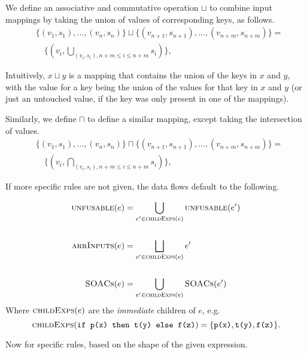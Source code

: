 \begin{description}
  We define an associative and commutative operation $\sqcup$ to
  combine input mappings by taking the union of values of
  corresponding keys, as follows.
  \begin{align*}
  &\{(v_{1},s_{1}),\ldots,(v_{n},s_{n})\} \sqcup \{(v_{n+1},s_{n+1}),\ldots,(v_{n+m},s_{n+m})\} =\\
  &\quad \{(v_{i}, \bigcup_{(v_{i},s_{i}),n+m \leq i \leq n+m} s_{i})\},
  \end{align*}

  Intuitively, $x \sqcup y$ is a mapping that contains the union of
  the keys in $x$ and $y$, with the value for a key being the union of
  the values for that key in $x$ and $y$ (or just an untouched value,
  if the key was only present in one of the mappings).

  Similarly, we define $\sqcap$ to define a similar mapping, except
  taking the intersection of values.
\begin{align*}
  &\{(v_{1},s_{1}),\ldots,(v_{n},s_{n})\} \sqcap \{(v_{n+1},s_{n+1}),\ldots,(v_{n+m},s_{n+m})\} =\\
  &\quad \{(v_{i}, \bigcap_{(v_{i},s_{i}),n+m \leq i \leq n+m} s_{i})\},
  \end{align*}
\end{description}

If more specific rules are not given, the data flows default to the
following.

\begin{align*}
  \textsc{unfusable}(e) &= \bigcup_{e'\in\textsc{childExps}(e)} \textsc{unfusable}(e') \\
  \\
  \textsc{arrInputs}(e) &= \bigsqcup_{e'\in\textsc{childExps}(e)} e'\\
  \\
  \textsc{SOACs}(e) &= \bigcup_{e'\in\textsc{childExps}(e)} \textsc{SOACs}(e')
\end{align*}
Where $\textsc{childExps}(e)$ are the \textit{immediate} children of $e$, e.g.
\[
\textsc{childExps}(\texttt{if p(x) then t(y) else f(z)}) = \{\texttt{p(x)}, \texttt{t(y)}, \texttt{f(z)}\}.
\]

Now for specific rules, based on the shape of the given expression.

